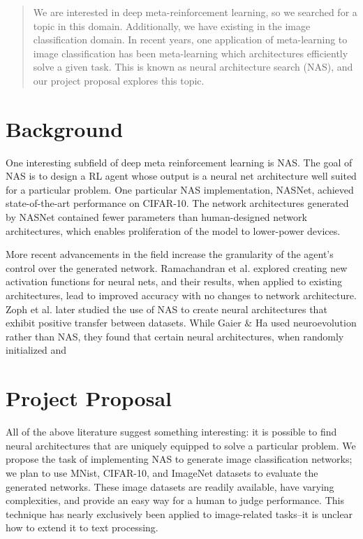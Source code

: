 \documentclass{article}
\begin{document}
\begin{abstract}
We are interested in deep meta-reinforcement learning, so we searched for a topic in this domain.
Additionally, we have existing in the image classification domain.
In recent years, one application of meta-learning to image classification has been meta-learning which architectures efficiently solve a given task.
This is known as neural architecture search (NAS), and our project proposal explores this topic.
\end{abstract}


\vspace{-2em}
\section{Background}

One interesting subfield of deep meta reinforcement learning is NAS.
The goal of NAS is to design a RL agent whose output is a neural net architecture well suited for a particular problem.
 One particular NAS implementation, NASNet, achieved state-of-the-art performance on CIFAR-10\cite{zoph2016neural}.
 The network architectures generated by NASNet contained fewer parameters than human-designed network architectures, which enables proliferation of the model to lower-power devices.
 
More recent advancements in the field increase the granularity of the agent’s control over the generated network.
Ramachandran et al. explored creating new activation functions for neural nets, and their results, when applied to existing architectures, lead to improved accuracy with no changes to network architecture\cite{ramach2017searching}.
Zoph et al. later studied the use of NAS to create neural architectures that exhibit positive transfer between datasets\cite{Zoph_2018}.
While Gaier \& Ha used neuroevolution rather than NAS, they found that certain neural architectures, when randomly initialized and

\section{Project Proposal}
All of the above literature suggest something interesting: it is possible to find neural architectures that are uniquely equipped to solve a particular problem.
We propose the task of implementing NAS to generate image classification networks; we plan to use MNist, CIFAR-10, and ImageNet datasets to evaluate the generated networks.
These image datasets are readily available, have varying complexities, and provide an easy way for a human to judge performance.
This technique has nearly exclusively been applied to image-related tasks--it is unclear how to extend it to text processing.
\end{document}
